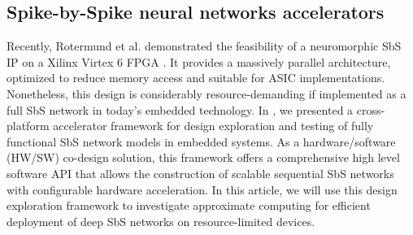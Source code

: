 \subsection{Spike-by-Spike neural networks accelerators}
Recently, Rotermund et al. demonstrated the feasibility of a neuromorphic SbS IP on a Xilinx Virtex 6 FPGA \cite{rotermund2018massively}. It provides a massively parallel architecture, optimized to reduce memory access and suitable for ASIC implementations. Nonetheless, this design is considerably resource-demanding if implemented as a full SbS network in today's embedded technology. In \cite{nevarez2020accelerator}, we presented a cross-platform accelerator framework for design exploration and testing of fully functional SbS network models in embedded systems. As a hardware/software (HW/SW) co-design solution, this framework offers a comprehensive high level software API that allows the construction of scalable sequential SbS networks with configurable hardware acceleration. In this article, we will use this design exploration framework to investigate approximate computing for efficient deployment of deep SbS networks on resource-limited devices.
